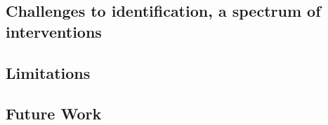 \subsection{Challenges to identification, a spectrum of interventions}

\subsection{Limitations}

\subsection{Future Work}
